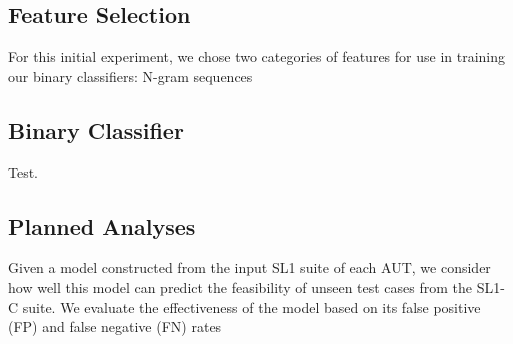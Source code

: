 \subsection{ Feature Selection }

For this initial experiment, we chose two categories of features for use in training our binary classifiers: N-gram sequences

\subsection{ Binary Classifier }

Test.

\subsection{ Planned Analyses }

Given a model constructed from the input SL1 suite of each AUT, we consider how well this model can predict the
feasibility of unseen test cases from the SL1-C suite. We evaluate the effectiveness of the model based on its
false positive (FP) and false negative (FN) rates

